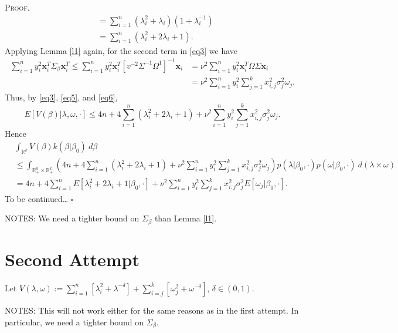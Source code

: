 \documentclass[12pt]{article}
\newcounter{ProofCounter}
\newenvironment{Proof}{\stepcounter{ProofCounter}\textsc{Proof.}}{\hfill$\square$}
\begin{document}
\begin{Proof}
\begin{align}
    & = \sum_{i=1}^{n}(\lambda_i^2 + \lambda_i)(1 + \lambda_i^{-1}) \nonumber \\
    & = \sum_{i=1}^{n}(\lambda_i^2 + 2\lambda_i + 1).
    \label{eq5}
  \end{align}
  Applying Lemma \ref{l1} again, for the second term in \eqref{eq3} we have 
  \begin{align}
    \sum_{i=1}^{n}y_i^2 \bm{x}_i^T\Sigma_{\beta} \bm{x}_i^T \leq \sum_{i=1}^{n}y_i^2 \bm{x}_i^T[v^{-2}\Sigma^{-1}\Omega^{1}]^{-1}\bm{x}_i & = \nu^2\sum_{i=1}^{n} y_i^2
    \bm{x}_i^T \Omega \Sigma \bm{x}_i \nonumber \\
    & = \nu^2 \sum_{i=1}^{n}y_i^2 \sum_{j=1}^{k}x_{i,j}^2 \sigma_{j}^2 \omega_j.
    \label{eq6}
  \end{align}
  Thus, by \eqref{eq3}, \eqref{eq5}, and \eqref{eq6}, 
  \[
    E[V(\beta)|\lambda, \omega, \cdot] \leq 4n + 4\sum_{i=1}^{n}(\lambda_i^2 + 2\lambda_i + 1) + \nu^2 \sum_{i=1}^{n}y_i^2 \sum_{j=1}^{k}x_{i,j}^2
    \sigma_j^2 \omega_j.
  \]
  Hence 
  \begin{align}
    & \int_{\mathbb{R}^{k}} V(\beta) k(\beta|\beta_0)\ d\beta \nonumber \\
    & \leq \int_{\mathbb{R}^{n}_+ \times \mathbb{R}^{k}_+}
    \left(4n + 4\sum_{i=1}^{n}(\lambda_i^2 + 2\lambda_i + 1) + \nu^2 \sum_{i=1}^{n}y_i^2 \sum_{j=1}^{k}x_{i,j}^2 \sigma_j^2 \omega_j \right)
    p(\lambda|\beta_0, \cdot) p(\omega|\beta_0,\cdot)\ d(\lambda \times \omega) \nonumber \\
    & = 4n + 4\sum_{i=1}^{n}E[\lambda_i^2 + 2\lambda_i + 1|\beta_0, \cdot] + \nu^2\sum_{i=1}^{n}y_i^2\sum_{j=1}^{k}x_{i,j}^2\sigma_j^2
    E[\omega_j|\beta_0,\cdot].
    \label{eq7}
  \end{align}
  {\Large To be continued\dots}
\end{Proof}

NOTES: We need a tighter bound on $\Sigma_{\beta}$ than Lemma \ref{l1}.

\newpage

\section{Second Attempt}

Let $V(\lambda, \omega) := \sum_{i=1}^{n}[\lambda_i^2 + \lambda^{-\delta}] + \sum_{i=j}^{k}[\omega_j^2 + \omega^{-\delta}]$, $\delta \in (0,1)$.

NOTES: This will not work either for the same reasons as in the first attempt. In particular, we need a tighter bound on $\Sigma_{\beta}$.
\end{document}
